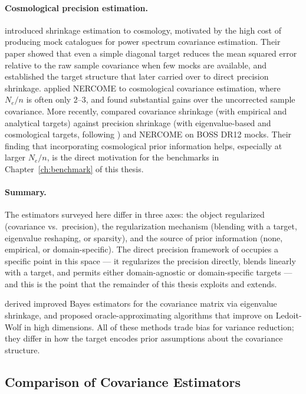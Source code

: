\paragraph{Cosmological precision estimation.}
\citet{pope2008shrinkage} introduced shrinkage estimation to cosmology, motivated by the high cost of producing mock catalogues for power spectrum covariance estimation. Their paper showed that even a simple diagonal target reduces the mean squared error relative to the raw sample covariance when few mocks are available, and established the target structure that \citet{looijmans2024comparison} later carried over to direct precision shrinkage. \citet{joachimi2017non} applied NERCOME to cosmological covariance estimation, where $N_e / n$ is often only 2--3, and found substantial gains over the uncorrected sample covariance. More recently, \citet{looijmans2024comparison} compared covariance shrinkage (with empirical and analytical targets) against precision shrinkage (with eigenvalue-based and cosmological targets, following \citealt{bodnar2016direct}) and NERCOME on BOSS DR12 mocks. Their finding that incorporating cosmological prior information helps, especially at larger $N_e / n$, is the direct motivation for the benchmarks in Chapter~\ref{ch:benchmark} of this thesis.

\paragraph{Summary.}
The estimators surveyed here differ in three axes: the object regularized (covariance vs.\ precision), the regularization mechanism (blending with a target, eigenvalue reshaping, or sparsity), and the source of prior information (none, empirical, or domain-specific). The direct precision framework of \citet{bodnar2016direct} occupies a specific point in this space --- it regularizes the precision directly, blends linearly with a target, and permits either domain-agnostic or domain-specific targets --- and this is the point that the remainder of this thesis exploits and extends.

\citep{haff1991variational} derived improved Bayes estimators for the covariance matrix via eigenvalue shrinkage, and \citep{chen2010shrinkage} proposed oracle-approximating algorithms that improve on Ledoit-Wolf in high dimensions. All of these methods trade bias for variance reduction; they differ in how the target encodes prior assumptions about the covariance structure.

\subsection{Comparison of Covariance Estimators}
\label{sec:cov_comparison}

